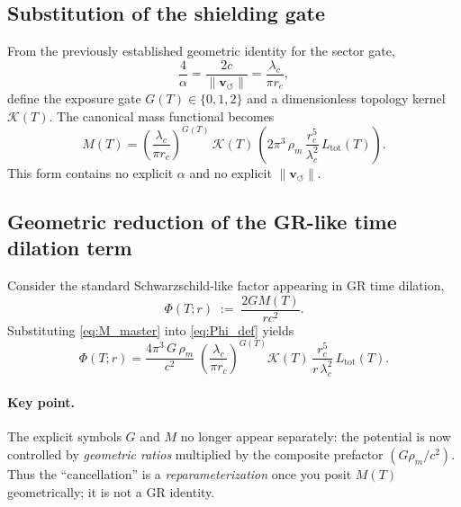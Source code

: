 \documentclass[11pt, a4paper]{article}
\newcommand{\vswirl}{\mathbf{v}_{\!\boldsymbol{\circlearrowleft}}}
\newcommand{\rhom}{\rho_{\!m}}
\newcommand{\rc}{r_c}
\newcommand{\Ltot}{L_{\text{tot}}}
\newcommand{\alphafs}{\alpha}
\begin{document}
        \subsection{Substitution of the shielding gate}
            From the previously established geometric identity for the sector gate,
            \begin{equation}
                \boxed{
                    \frac{4}{\alphafs}=\frac{2c}{\lVert \vswirl \rVert}=\frac{\lambda_c}{\pi \rc},
                }
                \label{eq:gate_geom2}
            \end{equation}
            define the exposure gate $G(T)\in\{0,1,2\}$ and a dimensionless topology kernel $\mathcal{K}(T)$.
            The canonical mass functional becomes
            \begin{equation}
                \boxed{
                    M(T)
                    =
                    \left(\frac{\lambda_c}{\pi \rc}\right)^{G(T)}
                    \,\mathcal{K}(T)\,
                    \left(
                        2\pi^3\,\rhom\,\frac{\rc^5}{\lambda_c^2}\,\Ltot(T)
                    \right).
                }
                \label{eq:M_master}
            \end{equation}
            This form contains no explicit $\alphafs$ and no explicit $\lVert \vswirl \rVert$.
        
        \subsection{Geometric reduction of the GR-like time dilation term}
            Consider the standard Schwarzschild-like factor appearing in GR time dilation,
            \begin{equation}
                \Phi(T;r) \;:=\; \frac{2G M(T)}{r c^2}.
                \label{eq:Phi_def}
            \end{equation}
            Substituting \eqref{eq:M_master} into \eqref{eq:Phi_def} yields
            \begin{equation}
                \boxed{
                    \Phi(T;r)
                    =
                    \frac{4\pi^3\,G\,\rhom}{c^2}\;
                    \left(\frac{\lambda_c}{\pi \rc}\right)^{G(T)}
                    \mathcal{K}(T)\,
                    \frac{\rc^5}{r\,\lambda_c^2}\,
                    \Ltot(T).
                }
                \label{eq:Phi_geom}
            \end{equation}
            
            \paragraph{Key point.}
                The explicit symbols $G$ and $M$ no longer appear separately: the potential is now controlled by \emph{geometric ratios} multiplied by the composite prefactor $(G\rhom/c^2)$.
                Thus the ``cancellation'' is a \emph{reparameterization} once you posit $M(T)$ geometrically; it is not a GR identity.
        
\end{document}
